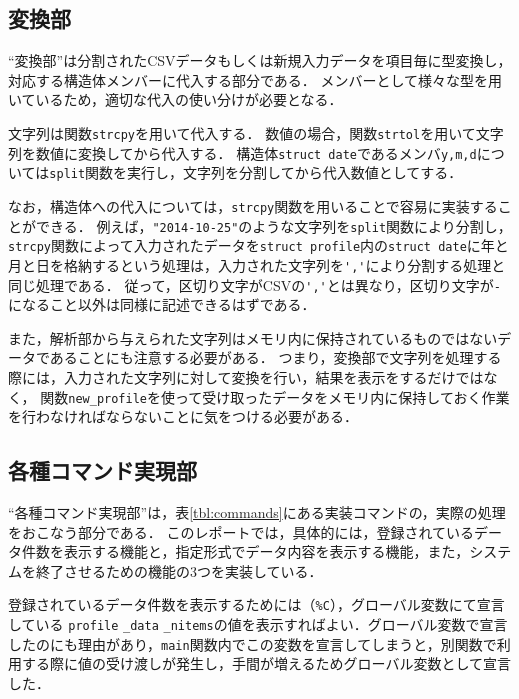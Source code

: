 \documentclass[a4j,11pt]{jarticle}
\begin{document}
\subsection{変換部} \label{sec:exchange}

``変換部''は分割されたCSVデータもしくは新規入力データを項目毎に型変換し，
対応する構造体メンバーに代入する部分である．
メンバーとして様々な型を用いているため，適切な代入の使い分けが必要となる．

文字列は関数\verb|strcpy|を用いて代入する．
数値の場合，関数\verb|strtol|を用いて文字列を数値に変換してから代入する．
構造体\verb|struct date|であるメンバ\verb|y,m,d|については\verb|split|関数を実行し，文字列を分割してから代入数値としてする．

なお，構造体への代入については，\verb|strcpy|関数を用いることで容易に実装することができる．
例えば，\verb|"2014-10-25"|のような文字列を\verb|split|関数により分割し，
\verb|strcpy|関数によって入力されたデータを\verb|struct profile|内の\verb|struct date|に年と月と日を格納するという処理は，入力された文字列を\verb|','|により分割する処理と同じ処理である．
従って，区切り文字がCSVの\verb|','|とは異なり，区切り文字が\verb|-|になること以外は同様に記述できるはずである．

また，解析部から与えられた文字列はメモリ内に保持されているものではないデータであることにも注意する必要がある．
つまり，変換部で文字列を処理する際には，入力された文字列に対して変換を行い，結果を表示をするだけではなく，
関数\verb|new_profile|を使って受け取ったデータをメモリ内に保持しておく作業を行わなければならないことに気をつける必要がある．

\subsection{各種コマンド実現部} \label{sec:command}

``各種コマンド実現部''は，表\ref{tbl:commands}にある実装コマンドの，実際の処理をおこなう部分である．
このレポートでは，具体的には，登録されているデータ件数を表示する機能と，指定形式でデータ内容を表示する機能，また，システムを終了させるための機能の3つを実装している．

登録されているデータ件数を表示するためには（\verb|%C|），グローバル変数にて宣言している
\verb|profile| \verb|_data| \verb|_nitems|の値を表示すればよい．グローバル変数で宣言したのにも理由があり，\verb|main|関数内でこの変数を宣言してしまうと，別関数で利用する際に値の受け渡しが発生し，手間が増えるためグローバル変数として宣言した．
\end{document}
